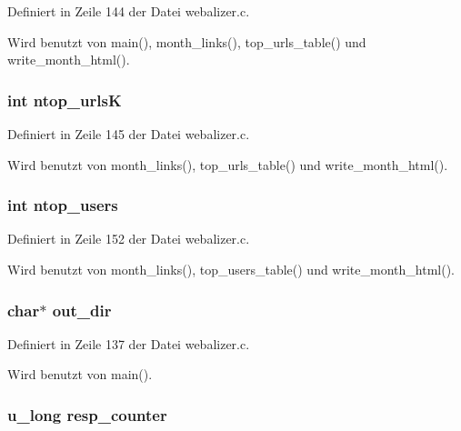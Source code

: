 Definiert in Zeile 144 der Datei webalizer.c.

Wird benutzt von main(), month\_\-links(), top\_\-urls\_\-table() und write\_\-month\_\-html().
\subsubsection{\setlength{\rightskip}{0pt plus 5cm}int {\bf ntop\_\-urls\-K}}\label{webalizer_8h_21acc4795c6bb4027a1bd2ad038fe3fa}




Definiert in Zeile 145 der Datei webalizer.c.

Wird benutzt von month\_\-links(), top\_\-urls\_\-table() und write\_\-month\_\-html().
\subsubsection{\setlength{\rightskip}{0pt plus 5cm}int {\bf ntop\_\-users}}\label{webalizer_8h_958b818c79b6fa3f2d0ab1ca4bb3e97c}




Definiert in Zeile 152 der Datei webalizer.c.

Wird benutzt von month\_\-links(), top\_\-users\_\-table() und write\_\-month\_\-html().
\subsubsection{\setlength{\rightskip}{0pt plus 5cm}char$\ast$ {\bf out\_\-dir}}\label{webalizer_8h_6910a5df32ce9909ffbacfafaa6e3645}




Definiert in Zeile 137 der Datei webalizer.c.

Wird benutzt von main().
\subsubsection{\setlength{\rightskip}{0pt plus 5cm}u\_\-long {\bf resp\_\-counter}}\label{webalizer_8h_520aedc681661bda91ae6b58266be08d}




